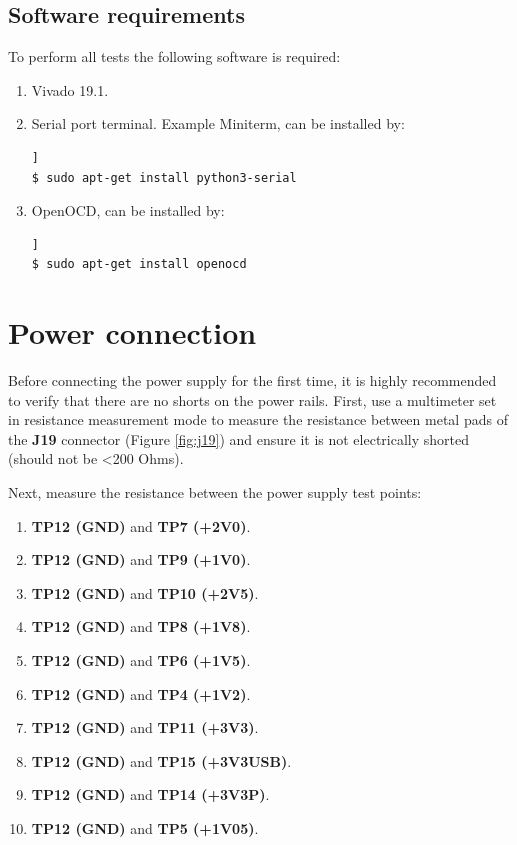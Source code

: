 \documentclass[12pt,oneside,a4]{article}
\begin{document}
\subsection{Software requirements}
To perform all tests the following software is required:
\begin{enumerate}
    \item Vivado 19.1.
    \item Serial port terminal. Example Miniterm, can be installed by:
	\begin{lstlisting}[backgroundcolor = \color{Gainsboro}, language=bash, frame=none]]
$ sudo apt-get install python3-serial
	\end{lstlisting}
	\item OpenOCD, can be installed by:
	\begin{lstlisting}[backgroundcolor = \color{Gainsboro}, language=bash, frame=none]]
$ sudo apt-get install openocd
	\end{lstlisting}
\end{enumerate}

\section{Power connection}\label{sec:Power_Connection}
Before connecting the power supply for the first time, it is highly recommended to verify that there are no shorts on the power rails.
First, use a multimeter set in resistance measurement mode to measure the resistance between metal pads of the \textbf{J19} connector (Figure \ref{fig:j19})
and ensure it is not electrically shorted (should not be <200 Ohms).

Next, measure the resistance between the power supply test points:

\begin{enumerate}
    \item \textbf{TP12 (GND)} and \textbf{TP7 (+2V0)}.
    \item \textbf{TP12 (GND)} and \textbf{TP9 (+1V0)}.
    \item \textbf{TP12 (GND)} and \textbf{TP10 (+2V5)}.
    \item \textbf{TP12 (GND)} and \textbf{TP8 (+1V8)}.
    \item \textbf{TP12 (GND)} and \textbf{TP6 (+1V5)}.
    \item \textbf{TP12 (GND)} and \textbf{TP4 (+1V2)}.
    \item \textbf{TP12 (GND)} and \textbf{TP11 (+3V3)}.
    \item \textbf{TP12 (GND)} and \textbf{TP15 (+3V3USB)}.
    \item \textbf{TP12 (GND)} and \textbf{TP14 (+3V3P)}.
    \item \textbf{TP12 (GND)} and \textbf{TP5 (+1V05)}.
\end{enumerate}
\end{document}
